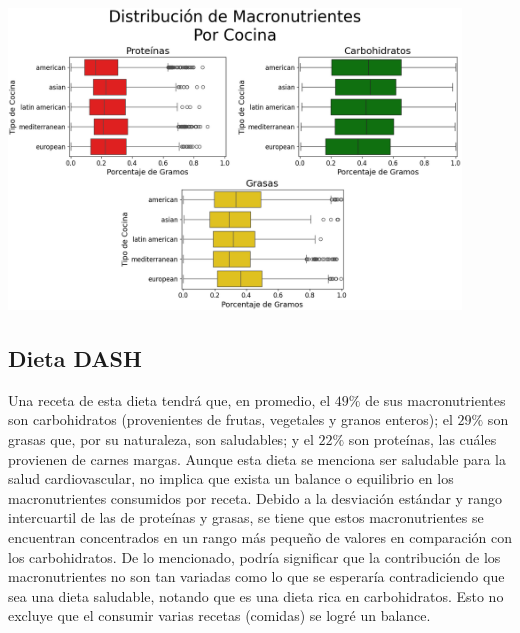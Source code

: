 \documentclass[12pt,a4paper]{article}
\begin{document}
{{            \begin{center}
                \includegraphics[width=0.9\textwidth]{Resources/EDA/VisionGeneral_2.png}
            \end{center}
        }
        
        \subsection{Dieta DASH}
        {
            Una receta de esta dieta tendrá que, en promedio, el $49\%$ de sus 
            macronutrientes son carbohidratos (provenientes de frutas, vegetales 
            y granos enteros); el $29\%$ son grasas que, por su naturaleza, son 
            saludables; y el $22\%$ son proteínas, las cuáles provienen de carnes margas.
            Aunque esta dieta se menciona ser saludable para la salud cardiovascular, 
            no implica que exista un balance o equilibrio en los macronutrientes 
            consumidos por receta. Debido a la desviación estándar y rango intercuartil de las 
            de proteínas y grasas, se tiene que estos macronutrientes se encuentran 
            concentrados en un rango más pequeño de valores en comparación con los 
            carbohidratos. De lo mencionado, podría significar que la contribución 
            de los macronutrientes no son tan variadas como lo que se esperaría 
            contradiciendo que sea una dieta saludable, notando que es una dieta 
            rica en carbohidratos. Esto no excluye que el consumir varias recetas 
            (comidas) se logré un balance.

}}
\end{document}
